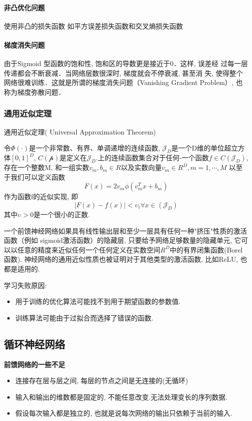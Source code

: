 \paragraph{非凸优化问题}
使用非凸的损失函数
如平方误差损失函数和交叉熵损失函数
\paragraph{梯度消失问题}
由于Sigmoid 型函数的饱和性, 饱和区的导数更是接近于0．这样, 误差经
过每一层传递都会不断衰减．当网络层数很深时, 梯度就会不停衰减, 甚至消
失, 使得整个网络很难训练．这就是所谓的梯度消失问题（Vanishing Gradient
Problem）, 也称为梯度弥散问题．

\subsubsection{通用近似定理}
通用近似定理( Universal Approximation Theorem) 

令$\Phi(\cdot)$是一个非常数、有界、单调递增的连续函数,  $\mathcal{J}_D$是一个D维的单位超立方体$[0, 1]^D$,  $C(\mathcal{p})$是定义在$\mathcal{J}_D$.上的连续函数集合对于任何-一个函数$f \in C(\mathcal{J}_D)$, 存在一个整数M, 和一组实数$v_m, b_m \in R$以及实数向量$v_m \in R^D, m= 1,  \cdots,  M$ 以至于我们可以定义函数
$$F(x) =2v_m \phi(v_m^T x + b_m)$$
作为函数f的近似实现, 即
$$|F(x)- f(x)|< \upsilon_i \forall x \in (\mathcal{J}_D) $$
其中$ \upsilon > 0$是一个很小的正数.


一个前馈神经网络如果具有线性输出层和至少一层具有任何一种"挤压"性质的激活函数（例如 sigmoid激活函数）的隐藏层, 只要给予网络足够数量的隐藏单元, 它可以以任意的精度来近似任何一个任何定义在实数空间$ R^D$中的有界闭集函数(Borel 函数). 神经网络的通用近似性质也被证明对于其他类型的激活函数, 比如ReLU, 也都是适用的.

学习失败原因:
\begin{itemize}
    \item 用于训练的优化算法可能找不到用于期望函数的参数值.
    \item 训练算法可能由于过拟合而选择了错误的函数.
\end{itemize}
\subsection{循环神经网络}

\textbf{前馈网络的一些不足}
\begin{itemize}
    \item 连接存在层与层之间, 每层的节点之间是无连接的(无循环)
    \item 输入和输出的维数都是固定的, 不能任意改变.无法处理变长的序列数据.
    \item 假设每次输入都是独立的, 也就是说每次网络的输出只依赖于当前的输入.
\end{itemize}

